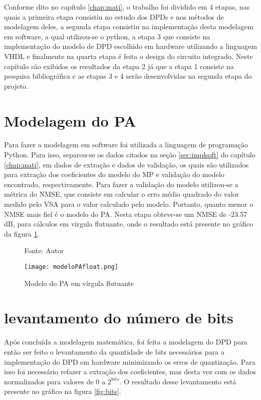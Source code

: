 Conforme dito no capítulo \ref{chap:mati}, o trabalho foi dividido em 4 etapas, nas quais a primeira etapa consistiu no estudo dos DPDs e nos métodos de modelagem deles, a segunda etapa consistiu na implementação desta modelagem em software, a qual utilizou-se o python, a etapa 3 que consiste na implementação do modelo de DPD escolhido em hardware utilizando a linguagem VHDL e finalmente na quarta etapa é feita o design do circuito integrado.
Neste capítulo são exibidos os resultados da etapa 2 já que a etapa 1 consiste na pesquisa bibliográfica e as etapas 3 e 4 serão desenvolvidas na segunda etapa do projeto.

\section{Modelagem do PA}

Para fazer a modelagem em software foi utilizada a linguagem de programação Python. Para isso, separou-se os dados citados na seção \ref{sec:implsoft} do capítulo \ref{chap:mati}, em dados de extração e dados de validação, os quais são utilizados para extração dos coeficientes do modelo do MP e validação do modelo encontrado, respectivamente. Para fazer a validação do modelo utilizou-se a métrica do NMSE, que consiste em calcular o erro médio quadrado do valor medido pelo VSA para o valor calculado pelo modelo. Portanto, quanto menor o NMSE mais fiel é o modelo do PA. Nesta etapa obteve-se um NMSE de -23.57 dB, para cálculos em virgula flutuante, onde o resultado está presente no gráfico da figura \ref{fig:modelopafloat}.

\begin{figure}[ht!]
    \centering
    \captionsetup{justification=centering}
    \caption*{Fonte: Autor}
    \texttt{[image: modeloPAfloat.png]}
    \caption{Modelo do PA em vírgula flutuante}
    \label{fig:modelopafloat}
\end{figure}

\section{levantamento do número de bits}

Após concluída a modelagem matemática, foi feita a modelagem do DPD para então ser feito o levantamento da quantidade de bits necessários para a implementação do DPD em hardware minimizando os erros de quantização. 
Para isso foi necessário refazer a extração dos coeficientes, mas desta vez com os dados normalizados para valores de 0 a $2^{bits}$.  
O resultado desse levantamento está presente no gráfico na figura \ref{fig:bits}.

